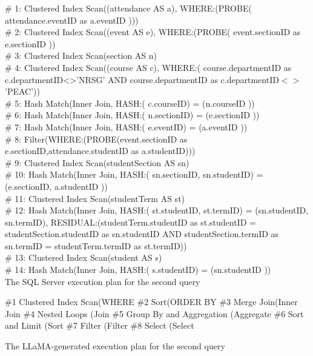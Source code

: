 \begin{text}
  \ContinuedFloat*
  \# 1: Clustered Index Scan((attendance AS a), WHERE:(PROBE( attendance.eventID as a.eventID )))\\
  \# 2: Clustered Index Scan((event AS e), WHERE:(PROBE( event.sectionID as e.sectionID ))\\
  \# 3: Clustered Index Scan(section AS n)\\
  \# 4: Clustered Index Scan((course AS c), WHERE:( course.departmentID as c.departmentID<>'NRSG' AND course.departmentID as c.departmentID$<>$'PEAC'))\\
  \# 5: Hash Match(Inner Join, HASH:( c.courseID) = (n.courseID ))\\
  \# 6: Hash Match(Inner Join, HASH:( n.sectionID) = (e.sectionID ))\\
  \# 7: Hash Match(Inner Join, HASH:( e.eventID) = (a.eventID ))\\
  \# 8: Filter(WHERE:(PROBE(event.sectionID as e.sectionID,attendance.studentID as a.studentID)))\\
  \# 9: Clustered Index Scan(studentSection AS sn)\\
  \# 10: Hash Match(Inner Join, HASH:( sn.sectionID, sn.studentID) = (e.sectionID, a.studentID ))\\
  \# 11: Clustered Index Scan(studentTerm AS st)\\
  \# 12: Hash Match(Inner Join, HASH:( st.studentID, st.termID) = (sn.studentID, sn.termID), RESIDUAL:(studentTerm.studentID as st.studentID = studentSection.studentID as sn.studentID AND studentSection.termID as sn.termID = studentTerm.termID as st.termID))\\
  \# 13: Clustered Index Scan(student AS s)\\
  \# 14: Hash Match(Inner Join, HASH:( s.studentID) = (sn.studentID ))\\
  \caption{The SQL Server execution plan for the second query}
\end{text}

\begin{text}
  \ContinuedFloat
  \#1 Clustered Index Scan(WHERE \#2 Sort(ORDER BY \#3 Merge Join(Inner Join \#4 Nested Loops (Join \#5 Group By and Aggregation (Aggregate \#6 Sort and Limit (Sort \#7 Filter (Filter \#8 Select (Select
  \caption{The LLaMA-generated execution plan for the second query}
\end{text}

